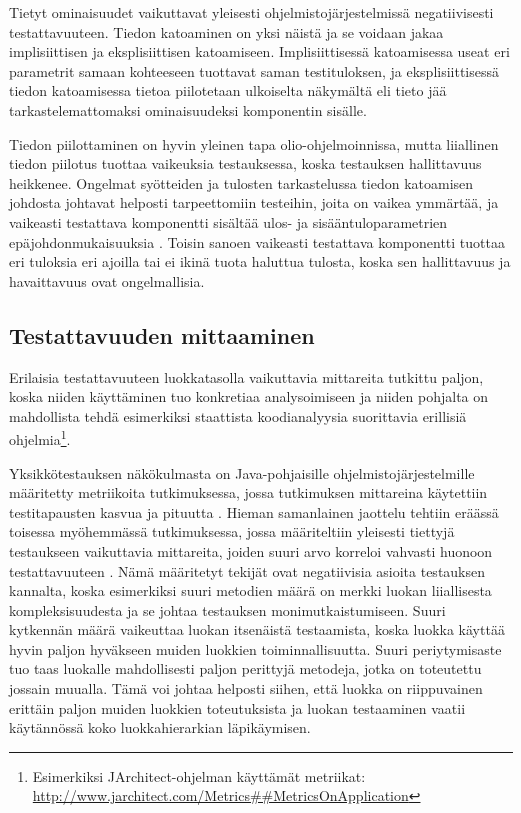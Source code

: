 \documentclass[finnish]{tktltiki2}
\numberwithin{table}{section}
\theoremstyle{definition}
\theoremstyle{remark}
\begin{document}
Tietyt ominaisuudet vaikuttavat yleisesti ohjelmistojärjestelmissä negatiivisesti testattavuuteen. Tiedon katoaminen on yksi näistä \citep{Voas:1995:STN:624607.625469} ja se voidaan jakaa implisiittisen ja eksplisiittisen  katoamiseen. Implisiittisessä katoamisessa useat eri parametrit samaan kohteeseen tuottavat saman testituloksen, ja eksplisiittisessä tiedon katoamisessa tietoa piilotetaan ulkoiselta näkymältä eli tieto jää tarkastelemattomaksi ominaisuudeksi komponentin sisälle. 

Tiedon piilottaminen on hyvin yleinen tapa olio-ohjelmoinnissa, mutta liiallinen tiedon piilotus tuottaa vaikeuksia testauksessa, koska testauksen hallittavuus heikkenee. %
Ongelmat syötteiden ja tulosten tarkastelussa tiedon katoamisen johdosta johtavat helposti tarpeettomiin testeihin, joita on vaikea ymmärtää, ja vaikeasti testattava komponentti sisältää ulos- ja sisääntuloparametrien epäjohdonmukaisuuksia \citep{Voas:1995:STN:624607.625469}. Toisin sanoen vaikeasti testattava komponentti tuottaa eri tuloksia eri ajoilla tai ei ikinä tuota haluttua tulosta, koska sen hallittavuus ja havaittavuus ovat ongelmallisia.   




\subsection{Testattavuuden mittaaminen} \label{testability_measure}


Erilaisia testattavuuteen luokkatasolla vaikuttavia mittareita tutkittu paljon, koska niiden käyttäminen tuo konkretiaa analysoimiseen ja niiden pohjalta on mahdollista tehdä esimerkiksi staattista koodianalyysia suorittavia erillisiä ohjelmia\footnote{Esimerkiksi JArchitect-ohjelman käyttämät metriikat: \url{http://www.jarchitect.com/Metrics##MetricsOnApplication}}. 

Yksikkötestauksen näkökulmasta on Java-pohjaisille ohjelmistojärjestelmille määritetty metriikoita tutkimuksessa, jossa tutkimuksen mittareina käytettiin testitapausten kasvua ja pituutta \citep{Bruntink:2004}. Hieman samanlainen jaottelu tehtiin eräässä toisessa myöhemmässä tutkimuksessa, jossa määriteltiin yleisesti tiettyjä testaukseen vaikuttavia mittareita, joiden suuri arvo korreloi vahvasti huonoon testattavuuteen \citep{Dubey:2011:AMM:2020976.2020983}. Nämä määritetyt tekijät ovat negatiivisia asioita testauksen kannalta, koska esimerkiksi suuri metodien määrä on merkki luokan liiallisesta kompleksisuudesta ja se johtaa testauksen monimutkaistumiseen. Suuri kytkennän määrä vaikeuttaa luokan itsenäistä testaamista, koska luokka käyttää hyvin paljon hyväkseen muiden luokkien toiminnallisuutta. Suuri periytymisaste tuo taas luokalle mahdollisesti paljon perittyjä metodeja, jotka on toteutettu jossain muualla. Tämä voi johtaa helposti siihen, että luokka on riippuvainen erittäin paljon muiden luokkien toteutuksista ja luokan testaaminen vaatii käytännössä koko luokkahierarkian läpikäymisen. 
\end{document}
